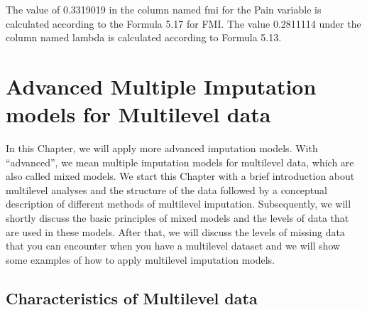 \documentclass[]{book}
\newenvironment{Shaded}{\begin{snugshade}}{\end{snugshade}}
\newcommand{\CommentTok}[1]{\textcolor[rgb]{0.56,0.35,0.01}{\textit{#1}}}
\theoremstyle{definition}
\theoremstyle{definition}
\theoremstyle{definition}
\theoremstyle{remark}
\begin{document}
\begin{Shaded}
\end{Shaded}

The value of 0.3319019 in the column named fmi for the Pain variable is
calculated according to the Formula 5.17 for FMI. The value 0.2811114
under the column named lambda is calculated according to Formula 5.13.

\chapter{Advanced Multiple Imputation models for Multilevel
data}\label{advanced-multiple-imputation-models-for-multilevel-data}

In this Chapter, we will apply more advanced imputation models. With
``advanced'', we mean multiple imputation models for multilevel data,
which are also called mixed models. We start this Chapter with a brief
introduction about multilevel analyses and the structure of the data
followed by a conceptual description of different methods of multilevel
imputation. Subsequently, we will shortly discuss the basic principles
of mixed models and the levels of data that are used in these models.
After that, we will discuss the levels of missing data that you can
encounter when you have a multilevel dataset and we will show some
examples of how to apply multilevel imputation models.

\section{Characteristics of Multilevel
data}\label{characteristics-of-multilevel-data}
\end{document}
